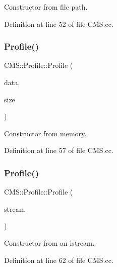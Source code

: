 Constructor from file path. 



Definition at line 52 of file C\+M\+S.\+cc.

\mbox{\label{class_c_m_s_1_1_profile_ad0430f199a119c916dbf6fa3c7bdff2d}} 
\subsubsection{\texorpdfstring{Profile()}{Profile()}\hspace{0.1cm}{\footnotesize\ttfamily [4/5]}}
{\footnotesize\ttfamily C\+M\+S\+::\+Profile\+::\+Profile (\begin{DoxyParamCaption}\item[{const unsigned char $\ast$}]{data,  }\item[{cms\+U\+Int32\+Number}]{size }\end{DoxyParamCaption})}



Constructor from memory. 



Definition at line 57 of file C\+M\+S.\+cc.

\mbox{\label{class_c_m_s_1_1_profile_a8c587e29eb6bc30ff4f9528347334081}} 
\subsubsection{\texorpdfstring{Profile()}{Profile()}\hspace{0.1cm}{\footnotesize\ttfamily [5/5]}}
{\footnotesize\ttfamily C\+M\+S\+::\+Profile\+::\+Profile (\begin{DoxyParamCaption}\item[{std\+::istream}]{stream }\end{DoxyParamCaption})}



Constructor from an istream. 



Definition at line 62 of file C\+M\+S.\+cc.

\mbox{\label{class_c_m_s_1_1_profile_ae70df5df1fdc50817033134b958d2ab9}} 
